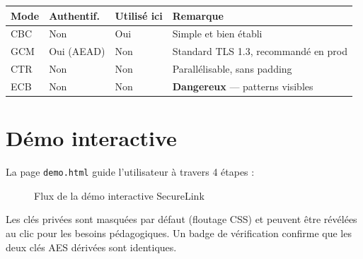 \documentclass[12pt,a4paper]{report}
\newcommand{\code}[1]{\texttt{#1}}
\begin{document}
\begin{center}
\begin{tabular}{L{2.5cm} C{2.5cm} C{2.5cm} L{4.5cm}}
  \toprule
  \textbf{Mode} & \textbf{Authentif.} & \textbf{Utilisé ici} & \textbf{Remarque} \\
  \midrule
  CBC  & Non     & Oui  & Simple et bien établi \\
  GCM  & Oui (AEAD) & Non & Standard TLS 1.3, recommandé en prod \\
  CTR  & Non     & Non  & Parallélisable, sans padding \\
  ECB  & Non     & Non  & \textbf{Dangereux} — patterns visibles \\
  \bottomrule
\end{tabular}
\end{center}

\section{Démo interactive}

La page \code{demo.html} guide l'utilisateur à travers 4 étapes :

\begin{figure}[h]
\centering
{}
\caption{Flux de la démo interactive SecureLink}
\end{figure}

Les clés privées sont masquées par défaut (floutage CSS) et peuvent être
révélées au clic pour les besoins pédagogiques. Un badge de vérification
confirme que les deux clés AES dérivées sont identiques.
\end{document}
